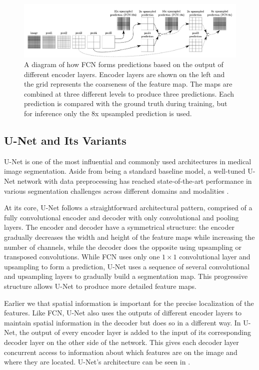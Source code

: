 \begin{figure}[h!]
 \centering
 \includegraphics[width=\linewidth]{images/fcn-arch}
 \caption{A diagram of how FCN forms predictions based on the output of different encoder layers. Encoder layers are shown on the left and the grid represents the coarseness of the feature map. The maps are combined at three different levels to produce three predictions. Each prediction is compared with the ground truth during training, but for inference only the 8x upsampled prediction is used. \cite{long2015fully}}
 \label{fig:fcn-arch}
 \end{figure}
 
 \subsection{U-Net and Its Variants}

U-Net \cite{ronnebergerUNetConvolutionalNetworks2015d} is one of the most influential and commonly used architectures in medical image segmentation. Aside from being a standard baseline model, a well-tuned U-Net network with data preprocessing has reached state-of-the-art performance in various segmentation challenges across different domains and modalities \cite{isenseeNnUNetSelfconfiguringMethod2021}.

At its core, U-Net follows a straightforward architectural pattern, comprised of a fully convolutional encoder and decoder with only convolutional and pooling layers. The encoder and decoder have a symmetrical structure: the encoder gradually decreases the width and height of the feature maps while increasing the number of channels, while the decoder does the opposite using upsampling or transposed convolutions. While FCN uses only one $1 \times 1$ convolutional layer and upsampling to form a prediction, U-Net uses a sequence of several convolutional and upsampling layers to gradually build a segmentation map. This progressive structure allows U-Net to produce more detailed feature maps.

Earlier we that spatial information is important for the precise localization of the features. Like FCN, U-Net also uses the outputs of different encoder layers to maintain spatial information in the decoder but does so in a different way. In U-Net, the output of every encoder layer is added to the input of its corresponding decoder layer on the other side of the network. This gives each decoder layer concurrent access to information about which features are on the image and where they are located. U-Net's architecture can be seen in .

